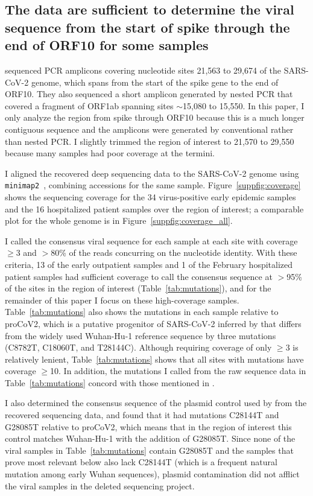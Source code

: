 \documentclass[9pt,twocolumn,twoside]{gsajnl_modified}
\begin{document}
\subsection{The data are sufficient to determine the viral sequence from the start of spike through the end of ORF10 for some samples}
\citet{wang2020medRxiv} sequenced PCR amplicons covering nucleotide sites 21,563 to 29,674 of the SARS-CoV-2 genome, which spans from the start of the spike gene to the end of ORF10.
They also sequenced a short amplicon generated by nested PCR that covered a fragment of ORF1ab spanning sites $\sim$15,080 to 15,550.
In this paper, I only analyze the region from spike through ORF10 because this is a much longer contiguous sequence and the amplicons were generated by conventional rather than nested PCR.
I slightly trimmed the region of interest to 21,570 to 29,550 because many samples had poor coverage at the termini.

I aligned the recovered deep sequencing data to the SARS-CoV-2 genome using \texttt{minimap2}~\citep{li2018minimap2}, combining accessions for the same sample.
Figure~\ref{suppfig:coverage} shows the sequencing coverage for the 34 virus-positive early epidemic samples and the 16 hospitalized patient samples over the region of interest; a comparable plot for the whole genome is in Figure~\ref{suppfig:coverage_all}.

I called the consensus viral sequence for each sample at each site with coverage $\ge$3 and $>$80\% of the reads concurring on the nucleotide identity.
With these criteria, 13 of the early outpatient samples and 1 of the February hospitalized patient samples had sufficient coverage to call the consensus sequence at $>$95\% of the sites in the region of interest (Table~\ref{tab:mutations}), and for the remainder of this paper I focus on these high-coverage samples.
Table~\ref{tab:mutations} also shows the mutations in each sample relative to proCoV2, which is a putative progenitor of SARS-CoV-2 inferred by \citet{kumar2021evolutionary} that differs from the widely used Wuhan-Hu-1 reference sequence by three mutations (C8782T, C18060T, and T28144C).
Although requiring coverage of only $\ge$3 is relatively lenient, Table~\ref{tab:mutations} shows that all sites with mutations have coverage $\ge$10.
In addition, the mutations I called from the raw sequence data in Table~\ref{tab:mutations} concord with those mentioned in \citet{wang2020small}.

I also determined the consensus sequence of the plasmid control used by \citet{wang2020medRxiv} from the recovered sequencing data, and found that it had mutations C28144T and G28085T relative to proCoV2, which means that in the region of interest this control matches Wuhan-Hu-1 with the addition of G28085T.
Since none of the viral samples in Table~\ref{tab:mutations} contain G28085T and the samples that prove most relevant below also lack C28144T (which is a frequent natural mutation among early Wuhan sequences), plasmid contamination did not afflict the viral samples in the deleted sequencing project.
\end{document}
